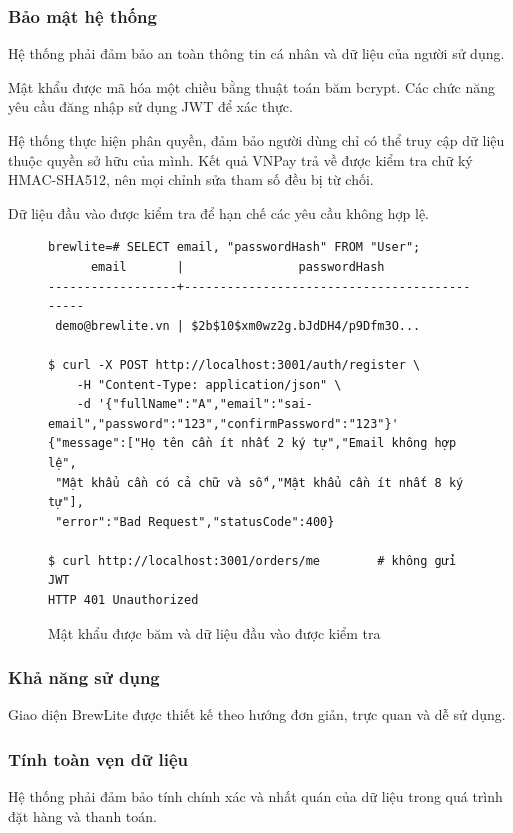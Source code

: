 \documentclass[12pt,a4paper]{article}
\begin{document}
\subsubsection{Bảo mật hệ thống}
Hệ thống phải đảm bảo an toàn thông tin cá nhân và dữ liệu của người sử dụng.

Mật khẩu được mã hóa một chiều bằng thuật toán băm bcrypt. Các chức năng yêu cầu đăng nhập sử dụng JWT để xác thực.

Hệ thống thực hiện phân quyền, đảm bảo người dùng chỉ có thể truy cập dữ liệu thuộc quyền sở hữu của mình. Kết quả VNPay trả về được kiểm tra chữ ký HMAC-SHA512, nên mọi chỉnh sửa tham số đều bị từ chối.

Dữ liệu đầu vào được kiểm tra để hạn chế các yêu cầu không hợp lệ.

\begin{figure}[H]
\centering
\begin{terminal}[0.95\textwidth]
\begin{Verbatim}
brewlite=# SELECT email, "passwordHash" FROM "User";
      email       |                passwordHash
------------------+---------------------------------------------
 demo@brewlite.vn | $2b$10$xm0wz2g.bJdDH4/p9Dfm3O...

$ curl -X POST http://localhost:3001/auth/register \
    -H "Content-Type: application/json" \
    -d '{"fullName":"A","email":"sai-email","password":"123","confirmPassword":"123"}'
{"message":["Họ tên cần ít nhất 2 ký tự","Email không hợp lệ",
 "Mật khẩu cần có cả chữ và số","Mật khẩu cần ít nhất 8 ký tự"],
 "error":"Bad Request","statusCode":400}

$ curl http://localhost:3001/orders/me        # không gửi JWT
HTTP 401 Unauthorized
\end{Verbatim}
\end{terminal}
\caption{Mật khẩu được băm và dữ liệu đầu vào được kiểm tra}
\end{figure}

\subsubsection{Khả năng sử dụng}
Giao diện BrewLite được thiết kế theo hướng đơn giản, trực quan và dễ sử dụng.

\subsubsection{Tính toàn vẹn dữ liệu}
Hệ thống phải đảm bảo tính chính xác và nhất quán của dữ liệu trong quá trình đặt hàng và thanh toán.
\end{document}
